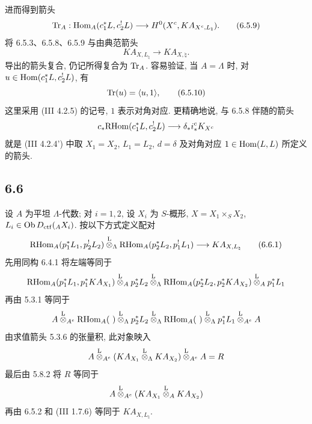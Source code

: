 进而得到箭头
\begin{equation}
\operatorname{Tr}_A:\operatorname{Hom}_A(c_1^*L,c_2^!L)
\longrightarrow
H^0(X^c,KA_{X^c,L_{\natural}}).
\tag{6.5.9}
\end{equation}
将 6.5.3、6.5.8、6.5.9 与由典范箭头
\[
KA_{X,L_{\natural}}\longrightarrow KA_{X,\natural}.
\]
导出的箭头复合, 仍记所得复合为 $\operatorname{Tr}_A$. 容易验证, 当 $A=\Lambda$ 时, 对 $u\in\operatorname{Hom}(c_1^*L,c_2^!L)$, 有
\begin{equation}
\operatorname{Tr}(u)=\langle u,1\rangle,
\tag{6.5.10}
\end{equation}
这里采用 (III 4.2.5) 的记号, $1$ 表示对角对应. 更精确地说, 与 6.5.8 伴随的箭头
\[
c_*\mathrm{RHom}(c_1^*L,c_2^!L)\longrightarrow \delta_*i_*^cK_{X^c}
\]
就是 (III 4.2.4') 中取 $X_1=X_2$, $L_1=L_2$, $d=\delta$ 及对角对应 $1\in\operatorname{Hom}(L,L)$ 所定义的箭头.

\subsection*{6.6}
设 $A$ 为平坦 $\Lambda$-代数; 对 $i=1,2$, 设 $X_i$ 为 $S$-概形, $X=X_1\times_SX_2$, $L_i\in\operatorname{Ob} D_{\mathrm{ctf}}({}_AX_i)$. 按以下方式定义配对
\begin{equation}
\mathrm{RHom}_A(p_1^*L_1,p_2^!L_2)
\overset{\mathrm L}{\otimes}_{\Lambda}
\mathrm{RHom}_A(p_2^*L_2,p_1^!L_1)
\longrightarrow
KA_{X,L_{\natural}}
\tag{6.6.1}
\end{equation}
先用同构 6.4.1 将左端等同于
\[
\mathrm{RHom}_A(p_1^*L_1,p_1^*KA_{X_1})
\overset{\mathrm L}{\otimes}_A p_2^*L_2
\overset{\mathrm L}{\otimes}_{\Lambda}
\mathrm{RHom}_A(p_2^*L_2,p_2^*KA_{X_2})
\overset{\mathrm L}{\otimes}_A p_1^*L_1
\]
再由 5.3.1 等同于
\[
A\overset{\mathrm L}{\otimes}_{A^e}\mathrm{RHom}_A(\ )\overset{\mathrm L}{\otimes}_{\Lambda}p_2^*L_2
 \overset{\mathrm L}{\otimes}_{\Lambda}\mathrm{RHom}_A(\ )\overset{\mathrm L}{\otimes}_{\Lambda}p_1^*L_1\overset{\mathrm L}{\otimes}_{A^e}A
\]
由求值箭头 5.3.6 的张量积, 此对象映入
\[
A\overset{\mathrm L}{\otimes}_{A^e}(KA_{X_1}\overset{\mathrm L}{\otimes}_{\Lambda}KA_{X_2})\overset{\mathrm L}{\otimes}_{A^e}A=R
\]
最后由 5.8.2 将 $R$ 等同于
\[
A\overset{\mathrm L}{\otimes}_{A^e}(KA_{X_1}\overset{\mathrm L}{\otimes}_AKA_{X_2})
\]
再由 6.5.2 和 (III 1.7.6) 等同于 $KA_{X,L_{\natural}}$.

